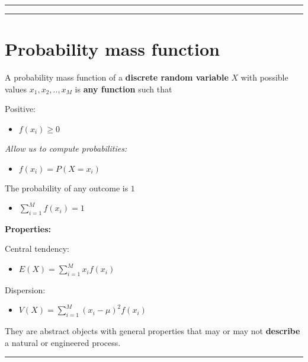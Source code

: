 \documentclass[
]{book}
\providecommand{\tightlist}{%
  \setlength{\itemsep}{0pt}\setlength{\parskip}{0pt}}
\begin{document}
\begin{center}\rule{0.5\linewidth}{0.5pt}\end{center}

\begin{center}\rule{0.5\linewidth}{0.5pt}\end{center}

\hypertarget{probability-mass-function}{%
\section{Probability mass function}\label{probability-mass-function}}

A probability mass function of a \textbf{discrete random variable} \(X\) with possible values \(x_1 , x_2 , .. , x_M\) is \textbf{any function} such that

Positive:

\begin{itemize}
\tightlist
\item
  \(f(x_i)\geq 0\)
\end{itemize}

\emph{Allow us to compute probabilities:}

\begin{itemize}
\tightlist
\item
  \(f(x_i)=P(X=x_i)\)
\end{itemize}

The probability of any outcome is \(1\)

\begin{itemize}
\tightlist
\item
  \(\sum_{i=1}^M f(x_i)=1\)
\end{itemize}

\textbf{Properties:}

Central tendency:

\begin{itemize}
\tightlist
\item
  \(E(X)= \sum_{i=1}^M x_i f(x_i)\)
\end{itemize}

Dispersion:

\begin{itemize}
\tightlist
\item
  \(V(X)= \sum_{i=1}^M (x_i-\mu)^2 f(x_i)\)
\end{itemize}

They are abstract objects with general properties that may or may not \textbf{describe} a natural or engineered process.

\begin{center}\rule{0.5\linewidth}{0.5pt}\end{center}
\end{document}
